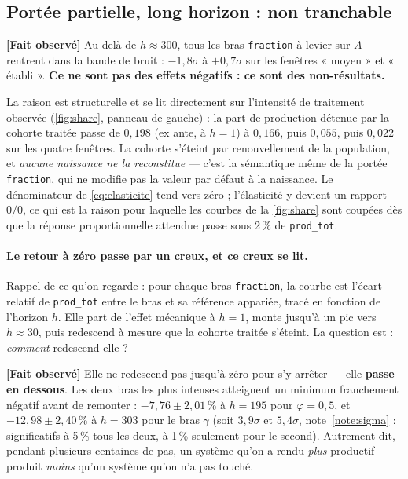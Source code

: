 \documentclass[11pt,a4paper]{article}
\newcommand{\code}[1]{\texttt{#1}}
\newcommand{\fait}{\textbf{[Fait observé]}}
\begin{document}
\subsection{Portée partielle, long horizon : non tranchable}

\fait{} Au-delà de $h\approx300$, tous les bras \code{fraction} à levier
sur $A$ rentrent dans la bande de bruit : $-1{,}8\sigma$ à $+0{,}7\sigma$
sur les fenêtres « moyen » et « établi ». \textbf{Ce ne sont pas des
effets négatifs : ce sont des non-résultats.}

La raison est structurelle et se lit directement sur l'intensité de
traitement observée (\autoref{fig:share}, panneau de gauche) : la part de
production détenue par la cohorte traitée passe de $0{,}198$ (ex ante, à
$h{=}1$) à $0{,}166$, puis $0{,}055$, puis $0{,}022$ sur les quatre
fenêtres. La cohorte s'éteint par renouvellement de la population, et
\emph{aucune naissance ne la reconstitue} --- c'est la sémantique même de
la portée \code{fraction}, qui ne modifie pas la valeur par défaut à la
naissance. Le dénominateur de \eqref{eq:elasticite} tend vers zéro ;
l'élasticité y devient un rapport $0/0$, ce qui est la raison pour
laquelle les courbes de la \autoref{fig:share} sont coupées dès que la
réponse proportionnelle attendue passe sous 2\,\% de \code{prod\_tot}.

\paragraph{Le retour à zéro passe par un creux, et ce creux se lit.}
Rappel de ce qu'on regarde : pour chaque bras \code{fraction}, la courbe est
l'écart relatif de \code{prod\_tot} entre le bras et sa référence appariée,
tracé en fonction de l'horizon $h$. Elle part de l'effet mécanique à $h=1$,
monte jusqu'à un pic vers $h\approx30$, puis redescend à mesure que la
cohorte traitée s'éteint. La question est : \emph{comment} redescend-elle ?

\fait{} Elle ne redescend pas jusqu'à zéro pour s'y arrêter --- elle
\textbf{passe en dessous}. Les deux bras les plus intenses atteignent un
minimum franchement négatif avant de remonter : $-7{,}76 \pm 2{,}01$\,\% à
$h = 195$ pour $\varphi = 0{,}5$, et $-12{,}98 \pm 2{,}40$\,\% à $h = 303$
pour le bras $\gamma$ (soit $3{,}9\sigma$ et $5{,}4\sigma$,
note~\ref{note:sigma} : significatifs à 5\,\% tous les deux, à 1\,\%
seulement pour le second). Autrement dit, pendant plusieurs centaines de
pas, un système qu'on a rendu \emph{plus} productif produit \emph{moins}
qu'un système qu'on n'a pas touché.
\end{document}

